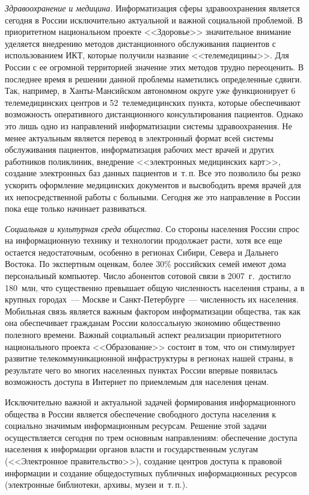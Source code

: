 \begin{multicols}{2}
     \vspace*{1pt}
     \textit{Здравоохранение и медицина.} Информатизация сферы здравоохранения
является сегодня в России исключительно актуальной и важной социальной проблемой. В
приоритетном национальном проекте <<Здоровье>> значительное внимание уделяется
внедрению методов дистанционного обслуживания пациентов с использованием ИКТ,
которые получили название <<телемедицины>>. Для России с ее огромной территорией
значение этих методов трудно переоценить. В последнее время в решении данной
проблемы наметились определенные сдвиги. Так, например, в Ханты-Мансийском
автономном округе уже функционирует 6 телемедицинских центров и
52~телемедицинских пункта, которые обеспечивают возможность оперативного
дистанционного консультирования пациентов. Однако это лишь одно из направлений
информатизации сис\-те\-мы здравоохранения. Не менее актуальным является перевод в
электронный формат всей сис\-те\-мы обслуживания пациентов, информатизация рабочих
мест врачей и других работников поликлиник, внедрение <<электронных медицинских
карт>>, создание электронных баз данных пациентов и~т.\,п. Все это позволило бы резко
ускорить оформление медицинских документов и высвободить время врачей для их
непосредственной работы с больными. Сегодня же это направление в России пока еще
только начинает развиваться.

     \vspace*{3pt}
     \textit{Социальная и культурная среда общества.} Со стороны населения России
спрос на информационную технику и технологии продолжает расти, хотя все еще остается
недостаточным, особенно в регионах Сибири, Севера и Дальнего Востока. По экспертным
оценкам, более 30\% российских семей имеют дома персональный компьютер. Число
абонентов сотовой связи в 2007~г.\ достигло 180~млн, что существенно превышает
общую численность населения страны, а в крупных городах~---  Москве и
     Санкт-Петербурге~--- численность их населения. Мобильная связь является важным
фактором информатизации общества, так как она обеспечивает гражданам России
колоссальную экономию общественно полезного времени. Важный социальный аспект
реализации приоритетного национального проекта <<Образование>> состоит в том, что
он стимулирует развитие телекоммуникационной инфраструктуры в регионах нашей
страны, в результате чего во многих населенных пунктах России впервые появилась
возможность доступа в Интернет по приемлемым для населения ценам.

     Исключительно важной и актуальной задачей формирования информационного
общества в России является обеспечение свободного доступа населения к социально
значимым информационным ресурсам. Решение этой задачи осуществляется сегодня по
трем основным направлениям: обеспечение доступа населения к информации органов
власти и государственным услугам (<<Электронное правительство>>), создание центров
доступа к правовой информации и создание общедоступных пуб\-лич\-ных информационных
ресурсов (электронные библиотеки, архивы, музеи и~т.\,п.).


\end{multicols}
